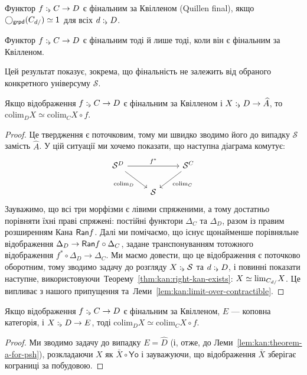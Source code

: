 \documentclass[12pt]{article}
\newcommand{\Space}{\mathcal{S}}
\newcommand{\PSH}[1]{\widehat{#1}}
\newcommand{\Yo}{\mathsf{Yo}}
\newcommand{\Equiv}{\mathrel{\simeq}}
\newcommand{\GM}{\flat}
\newcommand{\Colim}[1]{\mathrm{colim}_{#1}}
\newcommand{\Lim}[1]{\mathrm{lim}_{#1}}
\begin{document}
\begin{defi}
  Функтор $\DeclVar{f}{\GM}{C \to D}$ є фінальним за Квілленом (Quillen final), якщо $\Grpdify(\COSLICE{C}{d}) \Equiv \Unit$ для всіх $\DeclVar{d}{\GM}{D}$.
\end{defi}
\begin{thm}
  \label{thm:kan:theorem-a}
  Функтор $\DeclVar{f}{\GM}{C \to D}$ є фінальним тоді й лише тоді, коли він є фінальним за Квілленом.
\end{thm}

\begin{rem}
  Цей результат показує, зокрема, що фінальність не залежить від обраного конкретного універсуму $\Space$.
\end{rem}

\begin{lem}
  \label{lem:kan:theorem-a-for-psh}
  Якщо відображення $\DeclVar{f}{\GM}{C \to D}$ є фінальним за Квілленом і $\DeclVar{X}{\GM}{D \to \PSH{A}}$, то ${\Colim D} X \Equiv {\Colim C} X \circ f$.
\end{lem}
\begin{proof}
  Це твердження є поточковим, тому ми швидко зводимо його до випадку $\Space$ замість $\PSH{A}$. У цій ситуації ми хочемо показати, що наступна діаграма комутує:
  \[
    \begin{tikzcd}
      \Space^D \ar[rr,"f^*"]\ar[dr,"{\mathrm{colim}_D}"'] && \Space^C\ar[dl,"{\mathrm{colim}_C}"] \\
      & \Space &
    \end{tikzcd}
  \]
  Зауважимо, що всі три морфізми є лівими спряженими, а тому достатньо порівняти їхні праві спряжені: постійні функтори $\Delta_C$ та $\Delta_D$, разом із правим розширенням Кана $\mathsf{Ran} f$.
  Далі ми помічаємо, що існує щонайменше порівняльне відображення $\Delta_D \to \mathsf{Ran}{f} \circ \Delta_C$, задане транспонуванням тотожного відображення $f^* \circ \Delta_D \to \Delta_C$.
  Ми маємо довести, що це відображення є поточково оборотним, тому зводимо задачу до розгляду $\DeclVar{X}{\GM}{\Space}$ та $\DeclVar{d}{\GM}{D}$, і повинні показати наступне, використовуючи~Теорему~\ref{thm:kan:right-kan-exists}:
  $X \Equiv \Lim{\COSLICE{C}{d}} X$.
  Це випливає з нашого припущення та~Леми~\ref{lem:kan:limit-over-contractible}.
\end{proof}

\begin{lem}
  \label{lem:kan:theorem-a}
  Якщо відображення $\DeclVar{f}{\GM}{C \to D}$ є фінальним за Квілленом, $E$ --- коповна категорія, і $\DeclVar{X}{\GM}{D \to E}$, тоді ${\Colim D} X \Equiv {\Colim C} X \circ f$.
\end{lem}
\begin{proof}
  Ми зводимо задачу до випадку $E = \PSH{D}$ (і, отже, до Леми~\ref{lem:kan:theorem-a-for-psh}), розкладаючи $X$ як $\bar{X} \circ \Yo$ і зауважуючи, що відображення $\bar{X}$ зберігає кограниці за побудовою.
\end{proof}
\end{document}
